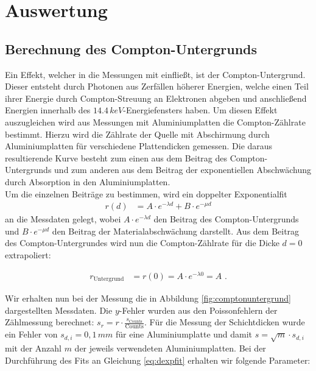 \section{Auswertung}

\subsection{Berechnung des Compton-Untergrunds}

Ein Effekt, welcher in die Messungen mit einfließt, ist der Compton-Untergrund. Dieser entsteht durch Photonen aus Zerfällen höherer Energien, welche einen Teil ihrer Energie durch Compton-Streuung an Elektronen abgeben und anschließend Energien innerhalb des $14.4\,\si{keV}$-Energiefensters haben. Um diesen Effekt auszugleichen wird aus Messungen mit Aluminiumplatten die Compton-Zählrate bestimmt. Hierzu wird die Zählrate der Quelle mit Abschirmung durch Aluminiumplatten für verschiedene Plattendicken gemessen. Die daraus resultierende Kurve besteht zum einen aus dem Beitrag des Compton-Untergrunds und zum anderen aus dem Beitrag der exponentiellen Abschwächung durch Absorption in den Aluminiumplatten.\\

Um die einzelnen Beiträge zu bestimmen, wird ein doppelter Exponentialfit
\begin{align}
	r(d)&=A\cdot e^{-\lambda d}+B\cdot e^{-\mu d}
\end{align}
an die Messdaten gelegt, wobei $A\cdot e^{-\lambda d}$ den Beitrag des Compton-Untergrunds und $B\cdot e^{-\mu d}$ den Beitrag der Materialabschwächung darstellt. Aus dem Beitrag des Compton-Untergrundes wird nun die Compton-Zählrate für die Dicke $d=0$ extrapoliert:

\begin{align}
	r_\text{Untergrund}&=r(0)=A\cdot e^{-\lambda 0}=A\text{ .}\label{eq:dexpfit}
\end{align}


Wir erhalten nun bei der Messung die in Abbildung \ref{fig:comptonuntergrund} dargestellten Messdaten. Die $y$-Fehler wurden aus den Poissonfehlern der Zählmessung berechnet: $s_r=r\cdot\frac{s_\text{Counts}}{\mathrm{Counts}}$. Für die Messung der Schichtdicken wurde ein Fehler von $s_{d,i}=0,1\,\si{mm}$ für eine Aluminiumplatte und damit $s=\sqrt{m}\cdot s_{d,i}$ mit der Anzahl $m$ der jeweils verwendeten Aluminiumplatten. Bei der Durchführung des Fits an Gleichung \ref{eq:dexpfit} erhalten wir folgende Parameter:

